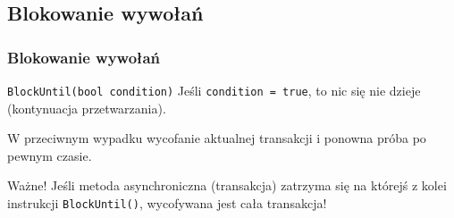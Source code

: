\documentclass{beamer}
\begin{document}

\subsection{Blokowanie wywołań}
\begin{frame}[fragile]
\frametitle{Blokowanie wywołań}
\begin{block}{\texttt{BlockUntil(bool condition)}}  
Jeśli \texttt{condition = true}, to nic się nie dzieje (kontynuacja przetwarzania).  

W przeciwnym wypadku wycofanie aktualnej transakcji i ponowna próba po pewnym czasie.
\end{block}  

\vspace{20px}

\begin{alertblock}{Ważne!}
Jeśli metoda asynchroniczna (transakcja) zatrzyma się na którejś z kolei instrukcji \texttt{BlockUntil()}, wycofywana jest cała transakcja!
\end{alertblock}
\end{frame}

\end{document}
